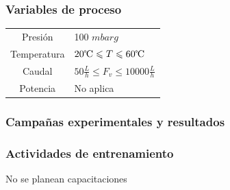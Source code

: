 \documentclass{article}
\begin{document}
\subsubsection*{Variables de proceso}
\begin{table}[H]
\centering
\begin{tabular}{cp{3.5cm}}
\toprule
Presión & 100 $mbarg$ \\
Temperatura & $20\celsius\leqslant T \leqslant60\celsius$ \\
Caudal & $50\frac{L}{h}\leqslant F_v \leqslant10000\frac{L}{h}$ \\
Potencia & No aplica \\
\bottomrule
\end{tabular}
\end{table}
\subsubsection*{Campañas experimentales y resultados}


\subsubsection*{Actividades de entrenamiento}
No se planean capacitaciones
\end{document}
